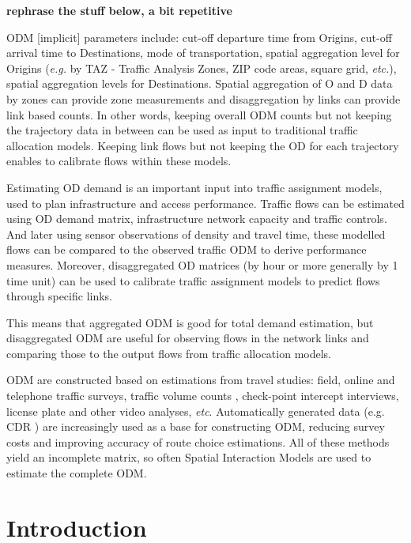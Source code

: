 \documentclass{llncs}
\begin{document}
{\bf rephrase the stuff below, a bit repetitive}

ODM [implicit] parameters include: cut-off departure time from Origins, cut-off arrival time to Destinations, mode of transportation, spatial aggregation level for Origins ({\it e.g.} by TAZ - Traffic Analysis Zones, ZIP code areas, square grid, {\it etc.}), spatial aggregation levels for Destinations. Spatial aggregation of O and D data by zones can provide zone measurements and disaggregation by links can provide link based counts. In other words, keeping overall ODM counts but not keeping the trajectory data in between can be used as input to traditional traffic allocation models. Keeping link flows but not keeping the OD for each trajectory enables to calibrate flows within these models.

Estimating OD demand is an important input into traffic assignment models, used to plan infrastructure and access performance. Traffic flows can be estimated using OD demand matrix, infrastructure network capacity and traffic controls. And later using sensor observations of density and travel time, these modelled flows can be compared to the observed traffic ODM to derive performance measures. Moreover, disaggregated OD matrices (by hour or more generally by 1 time unit) can be used to calibrate traffic assignment models to predict flows through specific links.


This means that aggregated ODM is good for total demand estimation, but disaggregated ODM are useful for observing flows in the network links and comparing those to the output flows from traffic allocation models.

ODM are constructed based on estimations from travel studies: field, online and telephone traffic surveys, traffic volume counts \cite{robillard1975},  check-point intercept interviews, license plate and other video analyses, {\it etc}. Automatically generated data (e.g. CDR \cite{iqbal2014}) are increasingly used as a base for constructing ODM, reducing survey costs and improving accuracy of route choice estimations. All of these methods yield an incomplete matrix, so often Spatial Interaction Models \cite{WILSON1967} are used to estimate the complete ODM.






\section{Introduction}
\end{document}

